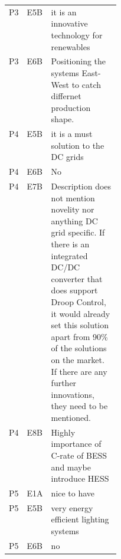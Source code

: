 \begin{longtable}{@{}>{\raggedright\arraybackslash}p{0.09\linewidth}>{\raggedright\arraybackslash}p{0.13\linewidth}>{\raggedright\arraybackslash}p{}@{}}
P3 & E5B & it is an innovative technology for renewables \\
P3 & E6B & Positioning the systems East-West to catch differnet production shape. \\
P4 & E5B & it is a must solution to the DC grids \\
P4 & E6B & No \\
P4 & E7B & Description does not mention novelity nor anything DC grid specific. If there is an integrated DC/DC converter that does support Droop Control, it would already set this solution apart from 90\% of the solutions on the market. If there are any further innovations, they need to be mentioned. \\
P4 & E8B & Highly importance of C-rate of BESS and maybe introduce HESS \\
P5 & E1A & nice to have \\
P5 & E5B & very energy efficient lighting systems \\
P5 & E6B & no \\
\end{longtable}

\par\smallskip
{}
\endgroup
